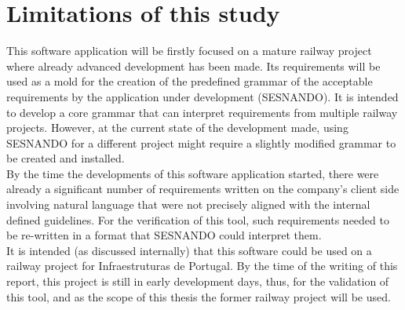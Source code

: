 \label{ch:2}
\chapter{Limitations of this study}

This software application will be firstly focused on a mature railway project where already advanced development has been made. Its requirements will be used as a mold for the creation of the predefined grammar of the acceptable requirements by the application under development (SESNANDO). It is intended to develop a core grammar that can interpret requirements from multiple railway projects. However, at the current state of the development made, using SESNANDO for a different project might require a slightly modified grammar to be created and installed. \\

By the time the developments of this software application started, there were already a significant number of requirements written on the company's client side involving natural language that were not precisely aligned with the internal defined guidelines. For the verification of this tool, such requirements needed to be re-written in a format that SESNANDO could interpret them.\\

It is intended (as discussed internally) that this software could be used on a railway project for Infraestruturas de Portugal. By the time of the writing of this report, this project is still in early development days, thus, for the validation of this tool, and as the scope of this thesis the former railway project will be used.\\
